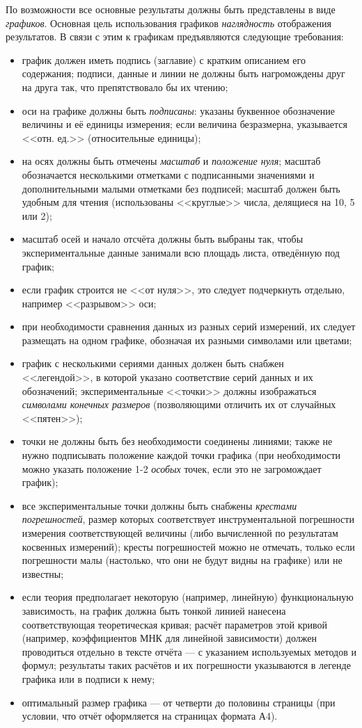 \documentclass[10pt]{article}
\begin{document}
По возможности все основные результаты должны быть представлены в
виде \emph{графиков}. Основная цель использования графиков \textendash{}
\emph{наглядность} отображения результатов. В связи с этим к графикам
предъявляются следующие требования:
\begin{itemize}
\item график должен иметь подпись (заглавие) с кратким описанием его содержания;
подписи, данные и линии не должны быть нагромождены друг на друга
так, что препятствовало бы их чтению;
\item оси на графике должны быть \emph{подписаны}: указаны буквенное обозначение
величины и её единицы измерения; если величина безразмерна, указывается
<<отн. ед.>> (относительные единицы); 
\item на осях должны быть отмечены \emph{масштаб} и \emph{положение нуля};
масштаб обозначается несколькими отметками с подписанными значениями
и дополнительными малыми отметками без подписей; масштаб должен быть
удобным для чтения (использованы <<круглые>>
числа, делящиеся на 10, 5 или 2);
\item масштаб осей и начало отсчёта должны быть выбраны так, чтобы экспериментальные
данные занимали всю площадь листа, отведённую под график;
\item если график строится не <<от нуля>>, это
следует подчеркнуть отдельно, например <<разрывом>>
оси; 
\item при необходимости сравнения данных из разных серий измерений, их следует
размещать на одном графике, обозначая их разными символами или цветами; 
\item график с несколькими сериями данных должен быть снабжен <<легендой>>,
в которой указано соответствие серий данных и их обозначений; экспериментальные
<<точки>> должны изображаться \emph{символами
конечных размеров} (позволяющими отличить их от случайных <<пятен>>); 
\item точки не должны быть без необходимости соединены линиями; также не
нужно подписывать положение каждой точки графика (при необходимости
можно указать положение 1-2 \emph{особых} точек, если это не загромождает
график);
\item все экспериментальные точки должны быть снабжены \emph{крестами погрешностей},
размер которых соответствует инструментальной погрешности измерения
соответствующей величины (либо вычисленной по результатам косвенных
измерений); кресты погрешностей можно не отмечать, только если погрешности
малы (настолько, что они не будут видны на графике) или не известны; 
\item если теория предполагает некоторую (например, линейную) функциональную
зависимость, на график должна быть тонкой линией нанесена соответствующая
теоретическая кривая; расчёт параметров этой кривой (например, коэффициентов
МНК для линейной зависимости) должен проводиться отдельно в тексте
отчёта --- с указанием используемых методов и формул; результаты
таких расчётов и их погрешности указываются в легенде графика или
в подписи к нему;
\item оптимальный размер графика --- от четверти до половины страницы
(при условии, что отчёт оформляется на страницах формата А4).
\end{itemize}
\end{document}
